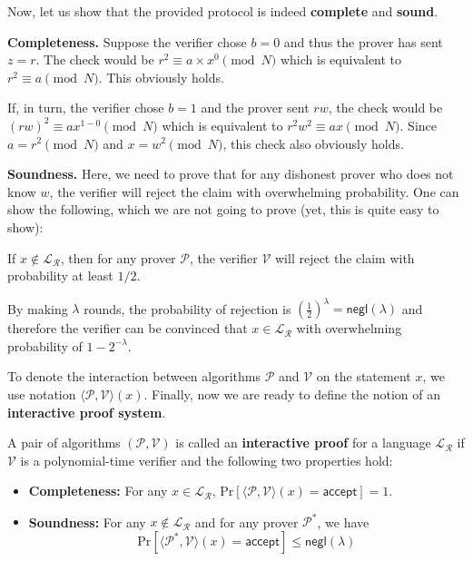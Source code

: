 \documentclass[../lecture-notes.tex]{subfiles}
\begin{document}
Now, let us show that the provided protocol is indeed \textbf{complete} and \textbf{sound}.

\textbf{Completeness.} Suppose the verifier chose $b=0$ and thus the prover has sent $z=r$. The check would be $r^2 \equiv a\times x^{0} \pmod{N}$ which is equivalent to $r^2 \equiv a \pmod{N}$. This obviously holds. 

If, in turn, the verifier chose $b=1$ and the prover sent $rw$, the check would be $(rw)^2 \equiv ax^{1-0} \pmod{N}$ which is equivalent to $r^2w^2 \equiv ax \pmod{N}$. Since $a = r^2 \pmod{N}$ and $x = w^2 \pmod{N}$, this check also obviously holds.

\textbf{Soundness.} Here, we need to prove that for any dishonest prover who does not know $w$, the verifier will reject the claim with overwhelming probability. One can show the following, which we are not going to prove (yet, this is quite easy to show):

\begin{proposition}
    If $x \not\in \mathcal{L}_{\mathcal{R}}$, then for any prover $\mathcal{P}$, the verifier $\mathcal{V}$ will reject the claim with probability at least $1/2$.
\end{proposition}

By making $\lambda$ rounds, the probability of rejection is $\left(\frac{1}{2}\right)^{\lambda} = \mathsf{negl}(\lambda)$ and therefore the verifier can be convinced that $x \in \mathcal{L}_{\mathcal{R}}$ with overwhelming probability of $1-2^{-\lambda}$.

To denote the interaction between algorithms $\mathcal{P}$ and $\mathcal{V}$ on the statement $x$, we use notation $\langle \mathcal{P}, \mathcal{V} \rangle(x)$. Finally, now we are ready to define the notion of an \textbf{interactive proof system}.

\begin{definition}
    A pair of algorithms $(\mathcal{P},\mathcal{V})$ is called an \textbf{interactive proof} for a language $\mathcal{L}_{\mathcal{R}}$ if $\mathcal{V}$ is a polynomial-time verifier and the following two properties hold:
    \begin{itemize}
        \item \textbf{Completeness:} For any $x \in \mathcal{L}_{\mathcal{R}}$, $\text{Pr}[\langle \mathcal{P}, \mathcal{V} \rangle(x) = \mathsf{accept}]=1$.
        \item \textbf{Soundness:} For any $x \not\in \mathcal{L}_{\mathcal{R}}$ and for any prover $\mathcal{P}^*$, we have 
        \begin{equation*}
            \text{Pr}[\langle \mathcal{P}^*, \mathcal{V} \rangle(x) = \mathsf{accept}] \leq \mathsf{negl}(\lambda)
        \end{equation*}
    \end{itemize}
\end{definition}
\end{document}
